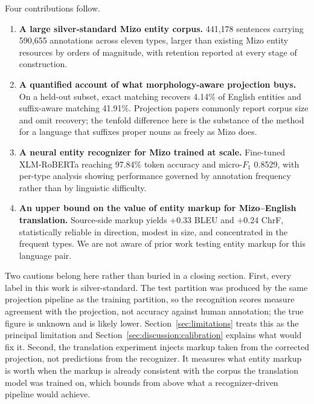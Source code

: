 \documentclass[acmsmall,screen,review]{acmart}
\begin{document}
Four contributions follow.

\begin{enumerate}[leftmargin=*,label=(\arabic*)]
  \item \textbf{A large silver-standard Mizo entity corpus.} 441,178 sentences
        carrying 590,655 annotations across eleven types, larger than existing
        Mizo entity resources by orders of magnitude, with retention reported at
        every stage of construction.
  \item \textbf{A quantified account of what morphology-aware projection buys.}
        On a held-out subset, exact matching recovers 4.14\% of English entities
        and suffix-aware matching 41.91\%. Projection papers commonly report
        corpus size and omit recovery; the tenfold difference here is the
        substance of the method for a language that suffixes proper nouns as
        freely as Mizo does.
  \item \textbf{A neural entity recognizer for Mizo trained at scale.}
        Fine-tuned XLM-RoBERTa reaching 97.84\% token accuracy and micro-$F_1$
        0.8529, with per-type analysis showing performance governed by
        annotation frequency rather than by linguistic difficulty.
  \item \textbf{An upper bound on the value of entity markup for Mizo--English
        translation.} Source-side markup yields $+0.33$ BLEU and $+0.24$ ChrF,
        statistically reliable in direction, modest in size, and concentrated in
        the frequent types. We are not aware of prior work testing entity markup
        for this language pair.
\end{enumerate}

Two cautions belong here rather than buried in a closing section. First, every
label in this work is silver-standard. The test partition was produced by the
same projection pipeline as the training partition, so the recognition scores
measure agreement with the projection, not accuracy against human annotation;
the true figure is unknown and is likely lower.
Section~\ref{sec:limitations} treats this as the principal limitation and
Section~\ref{sec:discussion:calibration} explains what would fix it. Second, the
translation experiment injects markup taken from the corrected projection, not
predictions from the recognizer. It measures what entity markup is worth when
the markup is already consistent with the corpus the translation model was
trained on, which bounds from above what a recognizer-driven pipeline would
achieve.
\end{document}

